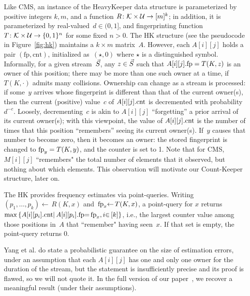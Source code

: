 \noindent Like CMS, an instance of the HeavyKeeper data structure is parameterized by positive integers $k,m$, and a function $R\colon \mathcal{K}\times\mathcal{U}\to[m]^k$; in addition, it is parameterized by real-valued~$d \in (0,1]$, and fingerprinting function $T\colon\mathcal{K}\times\mathcal{U}\to\{0,1\}^n$ for some fixed $n>0$.
The HK structure (see the pseudocode in Figure~\ref{fig:hk}) maintains a $k \times m$ matrix~$A$. However, each $A[i][j]$ holds a pair $(\mathrm{fp},\mathrm{cnt})$, initialized as~$(\star,0)$ where $\star$ is a distinguished symbol.  Informally, for a given stream~$\vec{S}$, any $z \in \vec{S}$ such that $A[i][j].\textup{fp}=T(K,z)$ is an owner of this position; there may be more than one such owner at a time, if $T(K,\cdot)$ admits many collisions. Ownership can change as a stream is processed: if some~$y$ arrives whose fingerprint is different than that of the current owner(s), then the current (positive) value~$c$ of $A[i][j].\textup{cnt}$ is decremented with probability $d^{-c}$.  Loosely, decrementing~$c$ is akin to $A[i][j]$ ``forgetting'' a prior arrival of its current owner(s); with this viewpoint, the value of $A[i][j].\textup{cnt}$ is the number of times that this position ``remembers'' seeing its current owner(s).  If~$y$ causes that number to become zero, then it becomes an owner: the stored fingerprint is changed to $\textup{fp}_y=T(K,y)$, and the counter is set to 1.  Note that for CMS, $M[i][j]$ ``remembers" the total number of elements that it observed, but nothing about which elements.  This observation will motivate our Count-Keeper structure, later on.

The HK provides frequency estimates via point-queries. Writing $(p_1,\allowbreak{\ldots}, p_k) \gets\, R(K,x)$ and~$\textup{fp}_x {\gets}\, T(K,x)$, a point-query for $x$ returns
$
{\max}\left\{A[i][p_i].\textup{cnt}{\mid}\, A[i][p_i].\mathrm{fp}{=}\,\textup{fp}_x{,}\, i{\in}\, [k]\right\}
$, i.e., the largest counter value among those positions in~$A$ that ``remember" having seen~$x$.  If that set is empty, the point-query returns 0. 

Yang et al.\cite{yang2019heavykeeper} do state a probabilistic guarantee on the size of estimation errors, under an assumption that each $A[i][j]$ has one and only one owner for the duration of the stream, but the statement is insufficiently precise and its proof is flawed, so we will not quote it.  In the full version of our paper~\cite{cfe_full_version}, we recover a meaningful result (under their assumptions).